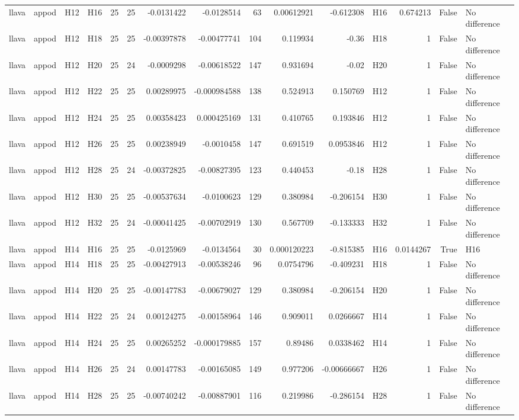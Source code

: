 \begin{longtable}{llllrrrrrrrlrrl}
llava & appod & H12 & H16 & 25 & 25 & -0.0131422 & -0.0128514 & 63 & 0.00612921 & -0.612308 & H16 & 0.674213 & False & No difference \\
llava & appod & H12 & H18 & 25 & 25 & -0.00397878 & -0.00477741 & 104 & 0.119934 & -0.36 & H18 & 1 & False & No difference \\
llava & appod & H12 & H20 & 25 & 24 & -0.0009298 & -0.00618522 & 147 & 0.931694 & -0.02 & H20 & 1 & False & No difference \\
llava & appod & H12 & H22 & 25 & 25 & 0.00289975 & -0.000984588 & 138 & 0.524913 & 0.150769 & H12 & 1 & False & No difference \\
llava & appod & H12 & H24 & 25 & 25 & 0.00358423 & 0.000425169 & 131 & 0.410765 & 0.193846 & H12 & 1 & False & No difference \\
llava & appod & H12 & H26 & 25 & 25 & 0.00238949 & -0.0010458 & 147 & 0.691519 & 0.0953846 & H12 & 1 & False & No difference \\
llava & appod & H12 & H28 & 25 & 24 & -0.00372825 & -0.00827395 & 123 & 0.440453 & -0.18 & H28 & 1 & False & No difference \\
llava & appod & H12 & H30 & 25 & 25 & -0.00537634 & -0.0100623 & 129 & 0.380984 & -0.206154 & H30 & 1 & False & No difference \\
llava & appod & H12 & H32 & 25 & 24 & -0.00041425 & -0.00702919 & 130 & 0.567709 & -0.133333 & H32 & 1 & False & No difference \\
llava & appod & H14 & H16 & 25 & 25 & -0.0125969 & -0.0134564 & 30 & 0.000120223 & -0.815385 & H16 & 0.0144267 & True & H16 \\
llava & appod & H14 & H18 & 25 & 25 & -0.00427913 & -0.00538246 & 96 & 0.0754796 & -0.409231 & H18 & 1 & False & No difference \\
llava & appod & H14 & H20 & 25 & 25 & -0.00147783 & -0.00679027 & 129 & 0.380984 & -0.206154 & H20 & 1 & False & No difference \\
llava & appod & H14 & H22 & 25 & 24 & 0.00124275 & -0.00158964 & 146 & 0.909011 & 0.0266667 & H14 & 1 & False & No difference \\
llava & appod & H14 & H24 & 25 & 25 & 0.00265252 & -0.000179885 & 157 & 0.89486 & 0.0338462 & H14 & 1 & False & No difference \\
llava & appod & H14 & H26 & 25 & 24 & 0.00147783 & -0.00165085 & 149 & 0.977206 & -0.00666667 & H26 & 1 & False & No difference \\
llava & appod & H14 & H28 & 25 & 25 & -0.00740242 & -0.00887901 & 116 & 0.219986 & -0.286154 & H28 & 1 & False & No difference \\

\end{longtable}
